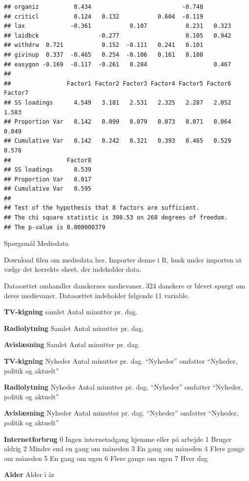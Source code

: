 \documentclass[]{book}
\begin{document}
\begin{verbatim}
## organiz          0.434                          -0.748                 
## criticl          0.124   0.132           0.604  -0.119                 
## lax             -0.361           0.107           0.231   0.323         
## laidbck                 -0.277                   0.105   0.942         
## withdrw  0.721           0.152  -0.111   0.241   0.101                 
## givinup  0.337  -0.465   0.254  -0.106   0.161   0.108                 
## easygon -0.169  -0.117  -0.261   0.284                   0.467         
## 
##                Factor1 Factor2 Factor3 Factor4 Factor5 Factor6 Factor7
## SS loadings      4.549   3.181   2.531   2.325   2.287   2.052   1.583
## Proportion Var   0.142   0.099   0.079   0.073   0.071   0.064   0.049
## Cumulative Var   0.142   0.242   0.321   0.393   0.465   0.529   0.578
##                Factor8
## SS loadings      0.539
## Proportion Var   0.017
## Cumulative Var   0.595
## 
## Test of the hypothesis that 8 factors are sufficient.
## The chi square statistic is 398.53 on 268 degrees of freedom.
## The p-value is 0.000000379
\end{verbatim}

Spørgsmål Mediedata

Download filen om mediedata her. Importer denne i R, husk under importen at vælge det korrekte sheet, der indeholder data.

Datasættet omhandler danskernes medievaner, 324 danskere er blevet spurgt om deres medievaner. Datasættet indeholder følgende 11 variable.

\textbf{TV-kigning}
samlet Antal minutter pr. dag.

\textbf{Radiolytning}
Samlet Antal minutter pr. dag.

\textbf{Avislæsning}
Samlet Antal minutter pr. dag.

\textbf{TV-kigning}
Nyheder Antal minutter pr. dag. ``Nyheder'' omfatter ``Nyheder, politik og aktuelt''

\textbf{Radiolytning}
Nyheder Antal minutter pr. dag. ``Nyheder'' omfatter ``Nyheder, politik og aktuelt''

\textbf{Avislæsning}
Nyheder Antal minutter pr. dag. ``Nyheder'' omfatter ``Nyheder, politik og aktuelt''

\textbf{Internetforbrug}
0 Ingen internetadgang hjemme eller på arbejde
1 Bruger aldrig
2 Mindre end en gang om måneden
3 En gang om måneden
4 Flere gange om måneden
5 En gang om ugen
6 Flere gange om ugen
7 Hver dag

\textbf{Alder}
Alder i år
\end{document}
